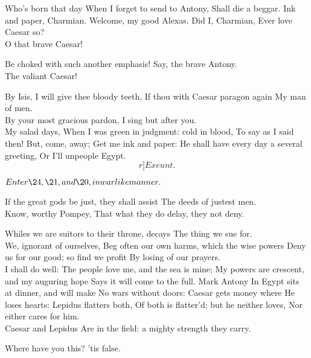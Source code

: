 \documentclass{book}
\begin{document}
\2	Who's born that day
	When I forget to send to Antony,  
	Shall die a beggar. Ink and paper, Charmian.
	Welcome, my good Alexas. Did I, Charmian,
	Ever love Caesar so? \\

\7	O that brave Caesar!

\2	Be choked with such another emphasis!
	Say, the brave Antony. \\

\7	The valiant Caesar!

\2	By Isis, I will give thee bloody teeth,
	If thou with Caesar paragon again
	My man of men. \\

\7	                  By your most gracious pardon,
	I sing but after you.  \\

\2	My salad days,
	When I was green in judgment: cold in blood,
	To say as I said then! But, come, away;
	Get me ink and paper:
	He shall have every day a several greeting,
	Or I'll unpeople Egypt.  \[r]Exeunt.\]

\Act
{}


	\(Enter \24, \21, and \20, in warlike manner.\)

	If the great gods be just, they shall assist
	The deeds of justest men. \\

	Know, worthy Pompey,
	That what they do delay, they not deny.

	Whiles we are suitors to their throne, decays
	The thing we sue for. \\

	We, ignorant of ourselves,
	Beg often our own harms, which the wise powers
	Deny us for our good; so find we profit
	By losing of our prayers. \\

	I shall do well:
	The people love me, and the sea is mine;
	My powers are crescent, and my auguring hope
	Says it will come to the full. Mark Antony
	In Egypt sits at dinner, and will make
	No wars without doors: Caesar gets money where
	He loses hearts: Lepidus flatters both,
	Of both is flatter'd; but he neither loves,
	Nor either cares for him. \\

	Caesar and Lepidus
	Are in the field: a mighty strength they carry.

	Where have you this? 'tis false. \\
\end{document}
